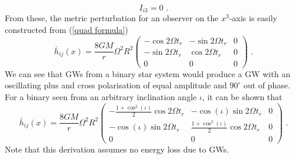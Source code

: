 \documentclass[11pt]{cuthesis}
\newcommand{\fs}{\text{ .}}
\begin{document}
\begin{equation}
I_{i3} = 0 \fs
\end{equation}
From these, the metric perturbation for an observer on the $x^3$-axis is easily constructed from (\ref{quad formula})
\begin{equation}
\bar{h}_{ij} (x)
=
\frac{8GM}{r}\Omega^2 R^2\begin{pmatrix} 
 -\cos 2 \Omega t_r & -\sin 2 \Omega t_r & 0 \\
-\sin 2 \Omega t_r & \cos 2 \Omega t_r & 0 \\
0 & 0 & 0
\end{pmatrix}
\fs
\end{equation}
We can see that GWs from a binary star system would produce a GW with an oscillating plus and cross polarisation of equal amplitude and $90^\circ$ out of phase. For a binary seen from an arbitrary inclination angle $\iota$, it can be shown that 
\begin{equation}
\bar{h}_{ij} (x)
=
\frac{8GM}{r}\Omega^2 R^2\begin{pmatrix} 
 -\frac{1+\cos^2(\iota)}{2}\cos 2 \Omega t_r & - \cos(\iota) \sin 2 \Omega t_r & 0 \\
-\cos(\iota) \sin 2 \Omega t_r & \frac{1+\cos^2(\iota)}{2} \cos 2 \Omega t_r & 0 \\
0 & 0 & 0
\end{pmatrix}
\fs
\end{equation}
Note that this derivation assumes no energy loss due to GWs. 
\end{document}
